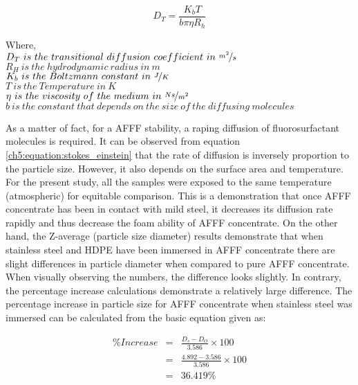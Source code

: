 \begin{equation}
    D_T=\frac{K_bT}{b\pi \eta R_h}
    \label{ch5:equation:stokes_einstein}
\end{equation}

\begin{doublespace}
Where, \\
$D_T\ is\ the\ transitional\ diffusion\ coefficient\ in\ \nicefrac{m^2}{s}$ \\
$R_H\ is\ the\ hydrodynamic\ radius\ in\ m$ \\
$K_b\ is\ the\ Boltzmann\ constant\ in\ \nicefrac{J}{K}$ \\
$T\ is\ the\ Temperature\ in\ K$ \\
$\eta\ is\ the\ viscosity\ of\ the\ medium\ in\ \nicefrac{Ns}{m^2}$ \\
$b\ is\ the\ constant\ that\ depends\ on\ the\ size\ of\ the\ diffusing\ molecules$ \\
\end{doublespace}

As a matter of fact, for a AFFF stability, a raping diffusion of fluorosurfactant molecules is required. It can be observed from equation \ref{ch5:equation:stokes_einstein} that the rate of diffusion is inversely proportion to the particle size. However, it also depends on the surface area and temperature. For the present study, all the samples were exposed to the same temperature (atmospheric) for equitable comparison. This is a demonstration that once AFFF concentrate has been in contact with mild steel, it decreases its diffusion rate rapidly and thus decrease the foam ability of AFFF concentrate.  On the other hand, the Z-average (particle size diameter) results demonstrate that when stainless steel and HDPE have been immersed in AFFF concentrate there are slight differences in particle diameter when compared to pure AFFF concentrate. When visually observing the numbers, the difference looks slightly. In contrary, the percentage increase calculations demonstrate a relatively large difference. The percentage increase in particle size for AFFF concentrate when stainless steel was immersed can be calculated from the basic equation given as: 

\begin{doublespace}
\begin{eqnarray}
    \%Increase &=& \frac{D_s - D_O}{3.586} \times 100 \\ 
    \nonumber &=& \frac{4.892 - 3.586}{3.586}\times 100 \\
    \nonumber &=& 36.419\%
    \label{ch5:equation:stainless_steel}
\end{eqnarray}
\end{doublespace}

